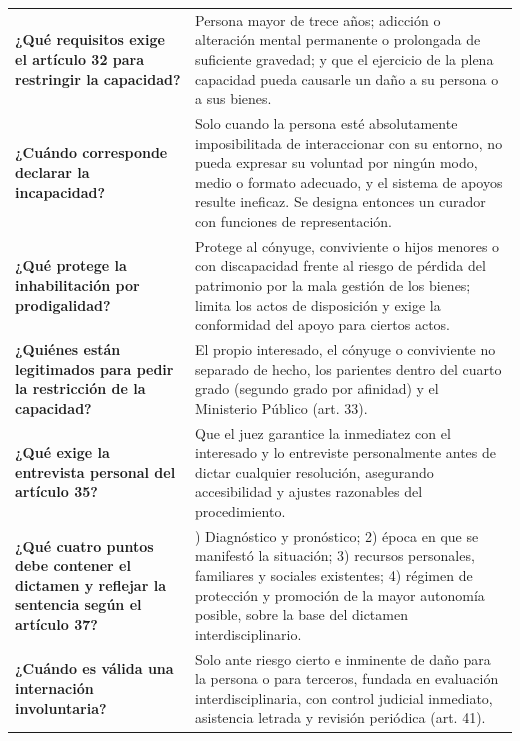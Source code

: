 \documentclass[12pt,oneside]{book}
\begin{document}
\begin{longtable}{
    >{\raggedright\arraybackslash}p{}
    >{\raggedright\arraybackslash}p{}
}
\textbf{¿Qué requisitos exige el artículo 32 para restringir la capacidad?} &
Persona mayor de trece años; adicción o alteración mental permanente o prolongada de suficiente gravedad; y que el ejercicio de la plena capacidad pueda causarle un daño a su persona o a sus bienes. \\[0.4em]

\textbf{¿Cuándo corresponde declarar la incapacidad?} &
Solo cuando la persona esté absolutamente imposibilitada de interaccionar con su entorno, no pueda expresar su voluntad por ningún modo, medio o formato adecuado, y el sistema de apoyos resulte ineficaz. Se designa entonces un curador con funciones de representación. \\[0.4em]

\textbf{¿Qué protege la inhabilitación por prodigalidad?} &
Protege al cónyuge, conviviente o hijos menores o con discapacidad frente al riesgo de pérdida del patrimonio por la mala gestión de los bienes; limita los actos de disposición y exige la conformidad del apoyo para ciertos actos. \\[0.4em]

\textbf{¿Quiénes están legitimados para pedir la restricción de la capacidad?} &
El propio interesado, el cónyuge o conviviente no separado de hecho, los parientes dentro del cuarto grado (segundo grado por afinidad) y el Ministerio Público (art. 33). \\[0.4em]

\textbf{¿Qué exige la entrevista personal del artículo 35?} &
Que el juez garantice la inmediatez con el interesado y lo entreviste personalmente antes de dictar cualquier resolución, asegurando accesibilidad y ajustes razonables del procedimiento. \\[0.4em]

\textbf{¿Qué cuatro puntos debe contener el dictamen y reflejar la sentencia según el artículo 37?} &
1) Diagnóstico y pronóstico; 2) época en que se manifestó la situación; 3) recursos personales, familiares y sociales existentes; 4) régimen de protección y promoción de la mayor autonomía posible, sobre la base del dictamen interdisciplinario. \\[0.4em]

\textbf{¿Cuándo es válida una internación involuntaria?} &
Solo ante riesgo cierto e inminente de daño para la persona o para terceros, fundada en evaluación interdisciplinaria, con control judicial inmediato, asistencia letrada y revisión periódica (art. 41). \\[0.4em]


\end{longtable}
\end{document}
